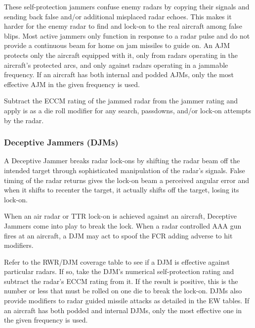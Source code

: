 These self-protection jammers confuse enemy radars by copying their signals and sending back false and/or additional misplaced radar echoes. This makes it harder for the enemy radar to find and lock-on to the real aircraft among false blips. Most active jammers only function in response to a radar pulse and do not provide a continuous beam for home on jam missiles to guide on. An AJM protects only the aircraft equipped with it, only from radars operating in the aircraft's protected arcs, and only against radars operating in a jammable frequency. If an aircraft has both internal and podded AJMs, only the most effective AJM in the given frequency is used.

Subtract the ECCM rating of the jammed radar from the  jammer rating and apply is as a die roll modifier for any search, passdowns, and/or lock-on attempts by the radar.


\subsubsection{Deceptive Jammers (DJMs)}

A Deceptive Jammer breaks radar lock-ons by shifting the radar beam off the intended target through sophisticated manipulation of the radar's signals. False timing of the radar returns gives the lock-on beam a perceived angular error and when it shifts to recenter the target, it actually shifts off the target, losing its lock-on.

When an air radar or TTR lock-on is achieved against an aircraft, Deceptive Jammers come into play to break the lock. When a radar controlled AAA gun fires at an aircraft, a DJM may act to spoof the FCR adding adverse to hit modifiers.

Refer to the RWR/DJM coverage table to see if a DJM is effective against particular radars. If so, take the DJM's numerical self-protection rating and subtract the radar's ECCM rating from it.  If the result is positive, this is the number or less that must be rolled on one die to break the lock-on. DJMs also provide modifiers to radar guided missile attacks as detailed in the EW tables. If an aircraft has both podded and internal DJMs, only the most effective one in the given frequency is used.


